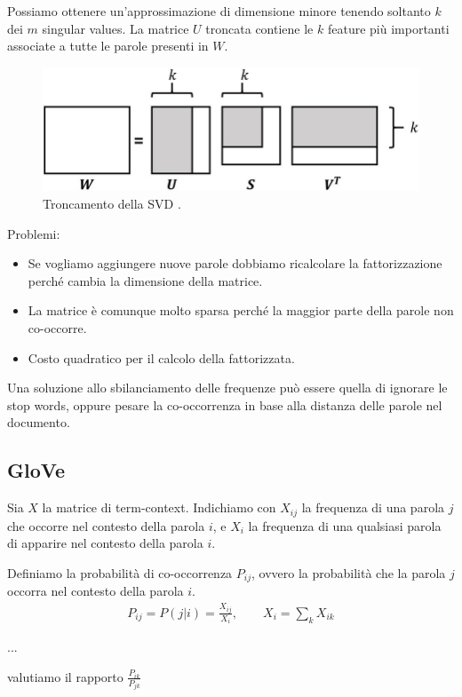 Possiamo ottenere un'approssimazione di dimensione minore tenendo soltanto $k$ dei $m$ singular values.
La matrice $U$ troncata contiene le $k$ feature più importanti associate a tutte le parole presenti in $W$.

\begin{figure}[ht]
  \centering
  \includegraphics[width=0.8\linewidth]{images/svd.png}
  \caption{Troncamento della SVD \cite{img:svd}.}
\end{figure}

Problemi:
\begin{itemize}
  \item Se vogliamo aggiungere nuove parole dobbiamo ricalcolare la fattorizzazione perché cambia la dimensione della matrice.
  \item La matrice è comunque molto sparsa perché la maggior parte della parole non co-occorre.
  \item Costo quadratico per il calcolo della fattorizzata.
\end{itemize}

Una soluzione allo sbilanciamento delle frequenze può essere quella di ignorare le stop words, oppure pesare la co-occorrenza in base
alla distanza delle parole nel documento.

\subsection{GloVe}
Sia $X$ la matrice di term-context. Indichiamo con $X_{ij}$ la frequenza di una parola $j$ che occorre nel contesto della parola $i$, e $X_i$
la frequenza di una qualsiasi parola di apparire nel contesto della parola $i$.

Definiamo la probabilità di co-occorrenza $P_{ij}$, ovvero la probabilità che la parola $j$ occorra nel contesto della parola $i$.
\begin{align*}
  P_{ij} = P(j | i) = \frac{X_{ij}}{X_i}, \qquad X_i = \sum_k X_{ik}
\end{align*}

...

valutiamo il rapporto $\frac{P_{ik}}{P_{jk}}$

